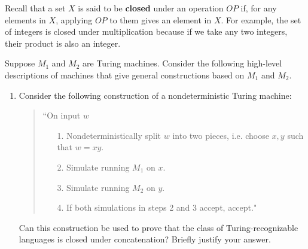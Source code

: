 \begin{enumerate}
    Recall that a set $X$ is said to be {\bf closed} under an operation $OP$ if, for any elements in $X$, applying 
    $OP$ to them gives an element in $X$.  For example, the set of integers is closed under multiplication
    because if we take any two integers, their product is also an integer.
    
    Suppose $M_1$  and $M_2$ are Turing machines.  Consider the following high-level  
    descriptions of machines that give general constructions based on  $M_1$  and $M_2$.
    
    \begin{enumerate}
    \item Consider the  following construction of a nondeterministic  Turing  machine:
    \begin{quote}
    ``On  input $w$
    \begin{itemize}
    \item[1.] Nondeterministically  split $w$ into two pieces, i.e. choose  $x,y$  such that  $w =  xy$.
    \item[2.] Simulate running $M_1$ on  $x$.
    \item[3.] Simulate running $M_2$ on  $y$.
    \item[4.] If both simulations in steps 2 and 3 accept, accept."
    \end{itemize}
    \end{quote}
    
    Can  this construction  be  used  to prove that the class  of  Turing-recognizable languages is closed under 
    concatenation? Briefly  justify your  answer.
    

\end{enumerate}
\end{enumerate}
